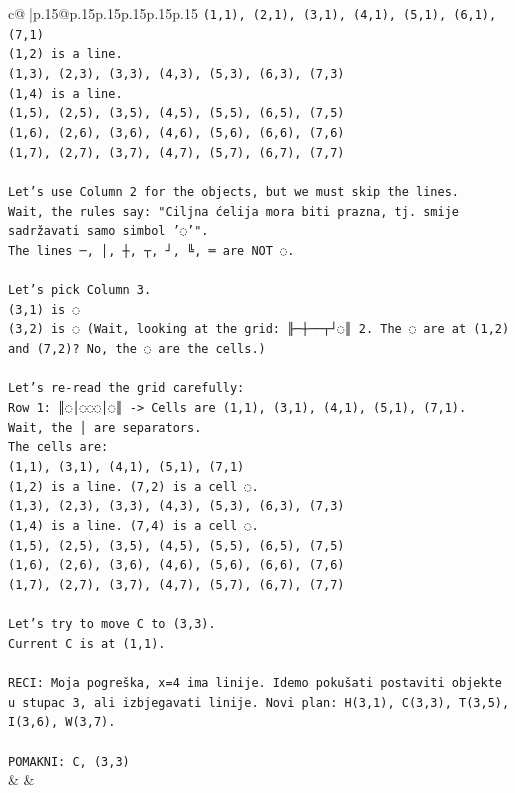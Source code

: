 \documentclass{article}
\begin{document}
{\begin{supertabular}{c@{$\;$}|p{.15\linewidth}@{}p{.15\linewidth}p{.15\linewidth}p{.15\linewidth}p{.15\linewidth}p{.15\linewidth}}
{{{\texttt{(1,1), (2,1), (3,1), (4,1), (5,1), (6,1), (7,1)} \\
\texttt{(1,2) is a line.} \\
\texttt{(1,3), (2,3), (3,3), (4,3), (5,3), (6,3), (7,3)} \\
\texttt{(1,4) is a line.} \\
\texttt{(1,5), (2,5), (3,5), (4,5), (5,5), (6,5), (7,5)} \\
\texttt{(1,6), (2,6), (3,6), (4,6), (5,6), (6,6), (7,6)} \\
\texttt{(1,7), (2,7), (3,7), (4,7), (5,7), (6,7), (7,7)} \\
\\ 
\texttt{Let's use Column 2 for the objects, but we must skip the lines.} \\
\texttt{Wait, the rules say: "Ciljna ćelija mora biti prazna, tj. smije sadržavati samo simbol '◌'".} \\
\texttt{The lines ─, │, ┼, ┬, ┘, ╚, ═ are NOT ◌.} \\
\\ 
\texttt{Let's pick Column 3.} \\
\texttt{(3,1) is ◌} \\
\texttt{(3,2) is ◌ (Wait, looking at the grid: ╟─┼──┬┘◌║ 2. The ◌ are at (1,2) and (7,2)? No, the ◌ are the cells.)} \\
\\ 
\texttt{Let's re{-}read the grid carefully:} \\
\texttt{Row 1: ║◌│◌◌◌│◌║ {-}> Cells are (1,1), (3,1), (4,1), (5,1), (7,1).} \\
\texttt{Wait, the │ are separators.} \\
\texttt{The cells are:} \\
\texttt{(1,1), (3,1), (4,1), (5,1), (7,1)} \\
\texttt{(1,2) is a line. (7,2) is a cell ◌.} \\
\texttt{(1,3), (2,3), (3,3), (4,3), (5,3), (6,3), (7,3)} \\
\texttt{(1,4) is a line. (7,4) is a cell ◌.} \\
\texttt{(1,5), (2,5), (3,5), (4,5), (5,5), (6,5), (7,5)} \\
\texttt{(1,6), (2,6), (3,6), (4,6), (5,6), (6,6), (7,6)} \\
\texttt{(1,7), (2,7), (3,7), (4,7), (5,7), (6,7), (7,7)} \\
\\ 
\texttt{Let's try to move C to (3,3).} \\
\texttt{Current C is at (1,1).} \\
\\ 
\texttt{RECI: Moja pogreška, x=4 ima linije. Idemo pokušati postaviti objekte u stupac 3, ali izbjegavati linije. Novi plan: H(3,1), C(3,3), T(3,5), I(3,6), W(3,7).} \\
\\ 
\texttt{POMAKNI: C, (3,3)} \\
            }
        }
    }
    & & \\ \\


\end{supertabular}}
\end{document}
